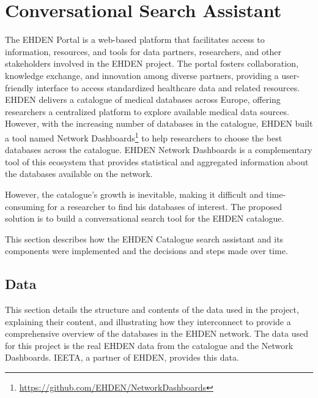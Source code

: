 \chapter{Conversational Search Assistant}
\label{chapter:ConversationalSearchAssistant}


The EHDEN Portal is a web-based platform that facilitates access to information, resources, and tools for data partners, researchers, and other stakeholders involved in the EHDEN project. The portal fosters collaboration, knowledge exchange, and innovation among diverse partners, providing a user-friendly interface to access standardized healthcare data and related resources. EHDEN delivers a catalogue of medical databases across Europe, offering researchers a centralized platform to explore available medical data sources. However, with the increasing number of databases in the catalogue, EHDEN built a tool named Network Dashboards\footnote{\url{https://github.com/EHDEN/NetworkDashboards}} to help researchers to choose the best databases across the catalogue. EHDEN Network Dashboards is a complementary tool of this ecosystem that provides statistical and aggregated information about the databases available on the network. 

However, the catalogue's growth is inevitable, making it difficult and time-consuming for a researcher to find his databases of interest. The proposed solution is to build a conversational search tool for the EHDEN catalogue.

This section describes how the EHDEN Catalogue search assistant and its components were implemented and the decisions and steps made over time.


\section{Data}
\label{data}

This section details the structure and contents of the data used in the project, explaining their content, and illustrating how they interconnect to provide a comprehensive overview of the databases in the EHDEN network. The data used for this project is the real EHDEN data from the catalogue and the Network Dashboards. IEETA, a partner of EHDEN, provides this data.

